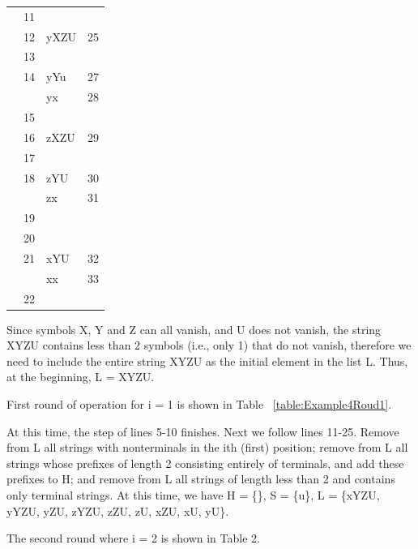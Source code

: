 \documentclass{sig-alternate-05-2015}
\begin{document}
\begin{table}[h]
\begin{tabular}{|l|l|l|l|}
  & 11 &                   &                        \\
  & 12 & yXZU              & 25                     \\
  & 13 &                   &                        \\
  & 14 & yYu               & 27                     \\
  &    & yx                & 28                     \\
  & 15 &                   &                        \\
  & 16 & zXZU              & 29                     \\
  & 17 &                   &                        \\
  & 18 & zYU               & 30                     \\
  &    & zx                & 31                     \\
  & 19 &                   &                        \\
  & 20 &                   &                        \\
  & 21 & xYU               & 32                     \\
  &    & xx                & 33                     \\
  & 22 &                   &                       \\
\hline
\end{tabular}
\end{table}


Since symbols X, Y and Z can all vanish, and U does
not vanish, the string XYZU contains less than 2 symbols
(i.e., only 1) that do not vanish, therefore we need to include
the entire string XYZU as the initial element in the
list L. Thus, at the beginning, L = {XYZU}.

First round of operation for i = 1 is shown in Table ~\ref{table:Example4Roud1}.

At this time, the step of lines 5-10 finishes. Next we follow
lines 11-25. Remove from L all strings with nonterminals
in the ith (first) position; remove from L all
strings whose prefixes of length 2 consisting entirely of
terminals, and add these prefixes to H; and remove from L
all strings of length less than 2 and contains only terminal
strings. At this time, we have H = \{\}, S = \{u\}, L = \{xYZU,
yYZU, yZU, zYZU, zZU, zU, xZU, xU, yU\}.

\hfill

The second round where i = 2 is shown in Table 2.
\end{document}
